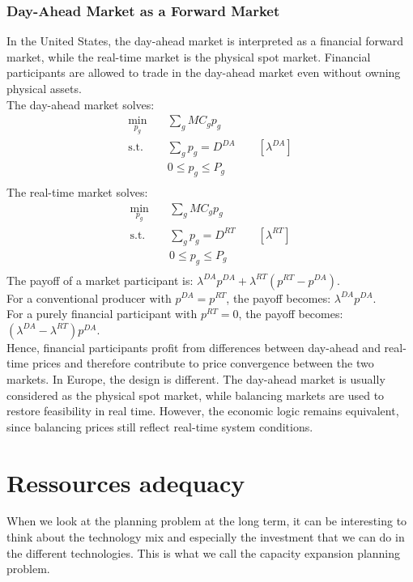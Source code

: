 \documentclass[12pt, openany]{report}
\theoremstyle{definition}
\begin{document}
\subsection{Day-Ahead Market as a Forward Market}
In the United States, the day-ahead market is interpreted as a financial forward market, while the real-time market is the physical spot market. Financial participants are allowed to trade in the day-ahead market even without owning physical assets.\\
The day-ahead market solves:
\begin{equation}
    \begin{aligned}
        \min_{p_g} &\sum_g MC_g p_g\\
        \text{s.t. } \quad &\sum_g p_g = D^{DA} \qquad [\lambda^{DA}] \\
        &0 \le p_g \le P_g \\
    \end{aligned}
\end{equation}
The real-time market solves:
\begin{equation}
    \begin{aligned}
        \min_{p_g} &\sum_g MC_g p_g\\
        \text{s.t. } \quad &\sum_g p_g = D^{RT} \qquad [\lambda^{RT}] \\
        &0 \le p_g \le P_g \\
    \end{aligned}
\end{equation}
The payoff of a market participant is: $\lambda^{DA}p^{DA} + \lambda^{RT}(p^{RT}-p^{DA})$.\\
For a conventional producer with $p^{DA}=p^{RT}$, the payoff becomes: $\lambda^{DA}p^{DA}$.\\
For a purely financial participant with $p^{RT}=0$, the payoff becomes: $(\lambda^{DA}-\lambda^{RT})p^{DA}$.\\
Hence, financial participants profit from differences between day-ahead and real-time prices and therefore contribute to price convergence between the two markets. In Europe, the design is different. The day-ahead market is usually considered as the physical spot market, while balancing markets are used to restore feasibility in real time. However, the economic logic remains equivalent, since balancing prices still reflect real-time system conditions.

\chapter{Ressources adequacy}
When we look at the planning problem at the long term, it can be interesting to think about the technology mix and especially the investment that we can do in the different technologies. This is what we call the capacity expansion planning problem. 
\end{document}
